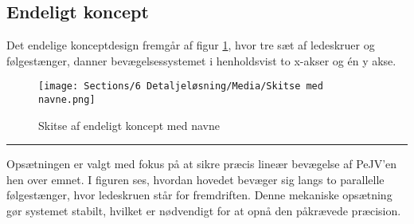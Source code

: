 \subsection{Endeligt koncept} \label{Endeligt koncept}
Det endelige konceptdesign fremgår af figur \ref{fig:skitse af endeligt koncept med navne}, hvor tre sæt af ledeskruer og følgestænger, danner bevægelsessystemet i henholdsvist to x-akser og én y akse.

\begin{figure}[H]
    \centering
    \texttt{[image: Sections/6 Detaljeløsning/Media/Skitse med navne.png]}
    \caption{Skitse af endeligt koncept med navne}
    \label{fig:skitse af endeligt koncept med navne}
\end{figure} \plainbreak{-.5}

Opsætningen er valgt med fokus på at sikre præcis lineær bevægelse af PeJV'en hen over emnet. I figuren ses, hvordan hovedet bevæger sig langs to parallelle følgestænger, hvor ledeskruen står for fremdriften. Denne mekaniske opsætning gør systemet stabilt, hvilket er nødvendigt for at opnå den påkrævede præcision.


